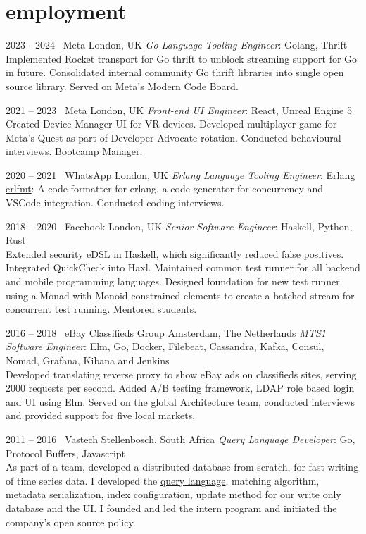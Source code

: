\documentclass[print]{friggeri-cv-a4} %
\begin{document}
\section{employment}
\begin{entrylist}

\entry
{2023 - 2024}
{\infty\ Meta}
{London, UK}
{\emph{Go Language Tooling Engineer}: Golang, Thrift \\
Implemented Rocket transport for Go thrift to unblock streaming support for Go in future.
Consolidated internal community Go thrift libraries into single open source library.
Served on Meta's Modern Code Board.
}

\entry
{2021 -- 2023}
{\infty\ Meta}
{London, UK}
{\emph{Front-end UI Engineer}: React, Unreal Engine 5 \\
Created Device Manager UI for VR devices. Developed multiplayer game for Meta's Quest as part of Developer Advocate rotation. Conducted behavioural interviews. Bootcamp Manager.
}

\entry
{2020 -- 2021}
{\faWhatsapp\ WhatsApp}
{London, UK}
{\emph{Erlang Language Tooling Engineer}: Erlang \\
\href{https://github.com/whatsapp/erlfmt}{erlfmt}: A code formatter for erlang, a code generator for concurrency and VSCode integration. Conducted coding interviews. 
}

\entry
{2018 -- 2020}
{\faFacebookSquare\ Facebook}
{London, UK}
{\emph{Senior Software Engineer}: Haskell, Python, Rust \\
Extended security eDSL in Haskell, which significantly reduced false positives. Integrated QuickCheck into Haxl.
Maintained common test runner for all backend and mobile programming languages. Designed foundation for new test runner using a Monad with Monoid constrained elements to create a batched stream for concurrent test running. Mentored students.
}

\entry
{2016 -- 2018}
{\faShoppingBasket\ eBay Classifieds Group}
{Amsterdam, The Netherlands}
{\emph{MTS1 Software Engineer}: Elm, Go, Docker, Filebeat, Cassandra, Kafka, Consul, Nomad, Grafana, Kibana and Jenkins \\
Developed translating reverse proxy to show eBay ads on classifieds sites, serving 2000 requests per second. Added A/B testing framework, LDAP role based login and UI using Elm. 
Served on the global Architecture team, conducted interviews and provided support for five local markets.
}

\entry
{2011 -- 2016}
{\faHeadphones\ Vastech}
{Stellenbosch, South Africa}
{\emph{Query Language Developer}: Go, Protocol Buffers, Javascript \\
As part of a team, developed a distributed database from scratch, for fast writing of time series data. I developed the \href{https://github.com/katydid/katydid}{query language}, matching algorithm, metadata serialization, index configuration, update method for our write only database and the UI. I founded and led the intern program and initiated the company's open source policy. 
}


\end{entrylist}
\end{document}
